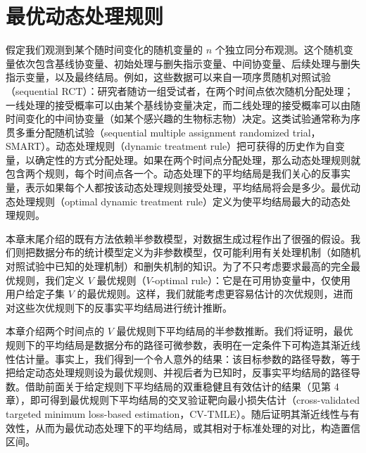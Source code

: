 \chapter{最优动态处理规则}
\label{ch:optimal-dynamic-treatment-rules}

假定我们观测到某个随时间变化的随机变量的 $n$ 个独立同分布观测。这个随机变量依次包含基线协变量、初始处理与删失指示变量、中间协变量、后续处理与删失指示变量，以及最终结局。例如，这些数据可以来自一项序贯随机对照试验（sequential RCT）：研究者随访一组受试者，在两个时间点依次随机分配处理；一线处理的接受概率可以由某个基线协变量决定，而二线处理的接受概率可以由随时间变化的中间协变量（如某个感兴趣的生物标志物）决定。这类试验通常称为序贯多重分配随机试验（sequential multiple assignment randomized trial，SMART）。动态处理规则（dynamic treatment rule）把可获得的历史作为自变量，以确定性的方式分配处理。如果在两个时间点分配处理，那么动态处理规则就包含两个规则，每个时间点各一个。动态处理下的平均结局是我们关心的反事实量，表示如果每个人都按该动态处理规则接受处理，平均结局将会是多少。最优动态处理规则（optimal dynamic treatment rule）定义为使平均结局最大的动态处理规则。

本章末尾介绍的既有方法依赖半参数模型，对数据生成过程作出了很强的假设。我们则把数据分布的统计模型定义为非参数模型，仅可能利用有关处理机制（如随机对照试验中已知的处理机制）和删失机制的知识。为了不只考虑要求最高的完全最优规则，我们定义 $V$ 最优规则（$V$-optimal rule）：它是在可用协变量中，仅使用用户给定子集 $V$ 的最优规则。这样，我们就能考虑更容易估计的次优规则，进而对这些次优规则下的反事实平均结局进行统计推断。

\begin{sourcebox}
本章介绍两个时间点的 $V$ 最优规则下平均结局的半参数推断。我们将证明，最优规则下的平均结局是数据分布的路径可微参数，表明在一定条件下可构造其渐近线性估计量。事实上，我们得到一个令人意外的结果：该目标参数的路径导数，等于把给定动态处理规则设为最优规则、并视后者为已知时，反事实平均结局的路径导数。借助前面关于给定规则下平均结局的双重稳健且有效估计的结果（见第 4 章），即可得到最优规则下平均结局的交叉验证靶向最小损失估计（cross-validated targeted minimum loss-based estimation，CV-TMLE）。随后证明其渐近线性与有效性，从而为最优动态处理下的平均结局，或其相对于标准处理的对比，构造置信区间。
\end{sourcebox}

